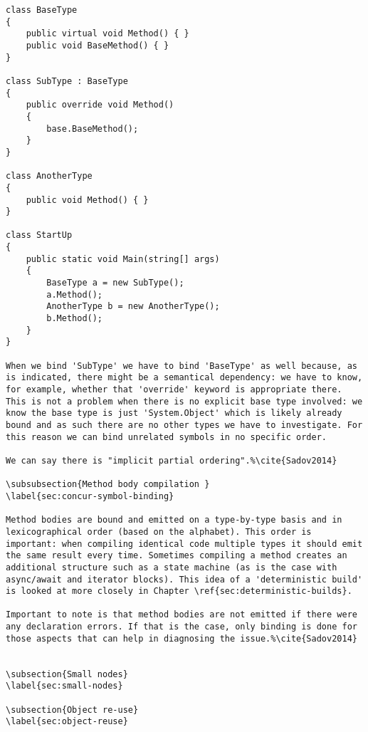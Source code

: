 \begin{lstlisting}
class BaseType
{
	public virtual void Method() { }
	public void BaseMethod() { }	
}

class SubType : BaseType
{
	public override void Method()
	{
		base.BaseMethod();
	}
}

class AnotherType
{
	public void Method() { }
}

class StartUp 
{
	public static void Main(string[] args)
	{
		BaseType a = new SubType();
		a.Method();
		AnotherType b = new AnotherType();
		b.Method();
	}
}

When we bind 'SubType' we have to bind 'BaseType' as well because, as is indicated, there might be a semantical dependency: we have to know, for example, whether that 'override' keyword is appropriate there. This is not a problem when there is no explicit base type involved: we know the base type is just 'System.Object' which is likely already bound and as such there are no other types we have to investigate. For this reason we can bind unrelated symbols in no specific order.

We can say there is "implicit partial ordering".%\cite{Sadov2014}

\subsubsection{Method body compilation }
\label{sec:concur-symbol-binding}

Method bodies are bound and emitted on a type-by-type basis and in lexicographical order (based on the alphabet). This order is important: when compiling identical code multiple types it should emit the same result every time. Sometimes compiling a method creates an additional structure such as a state machine (as is the case with async/await and iterator blocks). This idea of a 'deterministic build' is looked at more closely in Chapter \ref{sec:deterministic-builds}. 

Important to note is that method bodies are not emitted if there were any declaration errors. If that is the case, only binding is done for those aspects that can help in diagnosing the issue.%\cite{Sadov2014}


\subsection{Small nodes}
\label{sec:small-nodes}

\subsection{Object re-use}
\label{sec:object-reuse}


\end{lstlisting}
